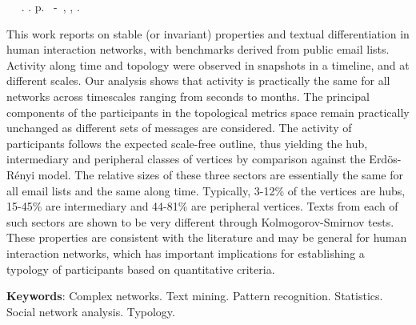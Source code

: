 \documentclass[
12pt,		%
openright,	%
twoside,  %
a4paper,			%
chapter=TITLE,		%
english,			%
french,				%
spanish,			%
brazil				%
]{USPSC}
\begin{document}
\begin{resumo}[Abstract]
	\begin{flushleft} 
		\setlength{\absparsep}{0pt} %
 		\SingleSpacing 
 		\imprimirautorabr~ ~\textbf{\imprimirtitleabstract}.	\imprimirdata.  \pageref{LastPage}p. 
		\imprimirtipotrabalho~-~\imprimirinstituicao, \imprimirlocal, 	\imprimirdata. 
 	\end{flushleft}
	\OnehalfSpacing 
	 This work reports on stable (or invariant) properties and textual differentiation in human interaction networks,
	 with benchmarks derived from public email lists.
	 Activity along time and topology were observed in snapshots in a timeline, and at
	 different scales. Our analysis shows that activity is practically the same for all networks across timescales
	 ranging from seconds to months. The principal components of the participants in the topological metrics
	 space remain practically unchanged as different sets of messages are considered.
	 The activity of participants
	 follows the expected scale-free outline, thus yielding the hub, intermediary and peripheral classes of vertices by
	 comparison against the Erdös-Rényi model.
	 The relative sizes of these three sectors are essentially the same
	 for all email lists and the same along time.
	 Typically, 3-12\% of the vertices are hubs, 15-45\% are intermediary
	 and 44-81\% are peripheral vertices.
	 Texts from each of such sectors are shown to be very different through Kolmogorov-Smirnov tests.
	 These properties are consistent with the literature and may be general for human
	 interaction networks, which has important implications for establishing a typology of participants based on
	 quantitative criteria.
   \vspace{\onelineskip}
 
   \noindent 
   \textbf{Keywords}: Complex networks. Text mining. Pattern recognition. Statistics. Social network analysis. Typology.
\end{resumo}
\end{document}
